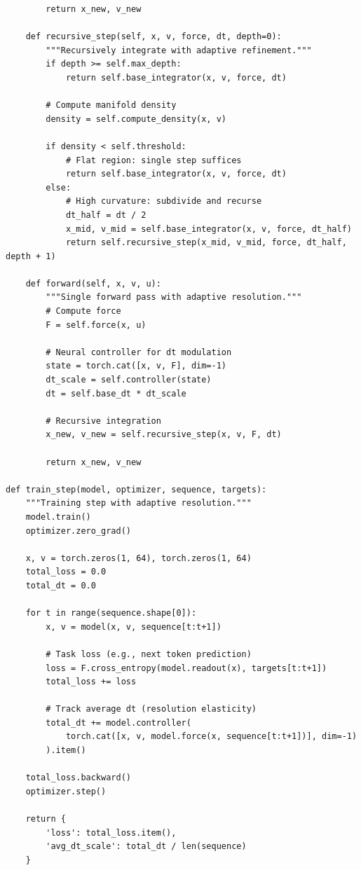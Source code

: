 \documentclass[12pt,letterpaper,twoside]{article}
\begin{document}
\begin{verbatim}
        return x_new, v_new
    
    def recursive_step(self, x, v, force, dt, depth=0):
        """Recursively integrate with adaptive refinement."""
        if depth >= self.max_depth:
            return self.base_integrator(x, v, force, dt)
        
        # Compute manifold density
        density = self.compute_density(x, v)
        
        if density < self.threshold:
            # Flat region: single step suffices
            return self.base_integrator(x, v, force, dt)
        else:
            # High curvature: subdivide and recurse
            dt_half = dt / 2
            x_mid, v_mid = self.base_integrator(x, v, force, dt_half)
            return self.recursive_step(x_mid, v_mid, force, dt_half, depth + 1)
    
    def forward(self, x, v, u):
        """Single forward pass with adaptive resolution."""
        # Compute force
        F = self.force(x, u)
        
        # Neural controller for dt modulation
        state = torch.cat([x, v, F], dim=-1)
        dt_scale = self.controller(state)
        dt = self.base_dt * dt_scale
        
        # Recursive integration
        x_new, v_new = self.recursive_step(x, v, F, dt)
        
        return x_new, v_new

def train_step(model, optimizer, sequence, targets):
    """Training step with adaptive resolution."""
    model.train()
    optimizer.zero_grad()
    
    x, v = torch.zeros(1, 64), torch.zeros(1, 64)
    total_loss = 0.0
    total_dt = 0.0
    
    for t in range(sequence.shape[0]):
        x, v = model(x, v, sequence[t:t+1])
        
        # Task loss (e.g., next token prediction)
        loss = F.cross_entropy(model.readout(x), targets[t:t+1])
        total_loss += loss
        
        # Track average dt (resolution elasticity)
        total_dt += model.controller(
            torch.cat([x, v, model.force(x, sequence[t:t+1])], dim=-1)
        ).item()
    
    total_loss.backward()
    optimizer.step()
    
    return {
        'loss': total_loss.item(),
        'avg_dt_scale': total_dt / len(sequence)
    }
\end{verbatim}
\end{document}
